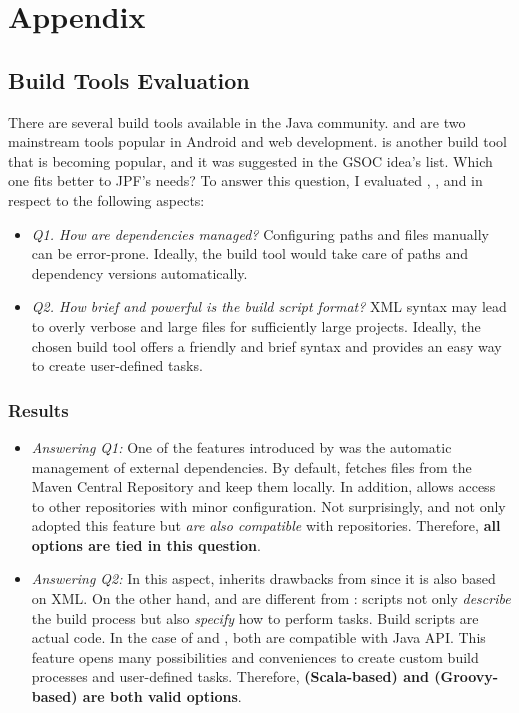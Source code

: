\documentclass{article}
\begin{document}
\section{Appendix}
\subsection{Build Tools Evaluation}
\label{sec:eval}

There are several build tools available in the Java community.
\maven{} and \gradle{} are two mainstream tools popular in Android and web
development.
\sbt{}\cite{page:sbt} is another build tool that is becoming popular, and it
was suggested in the GSOC idea's list\cite{page:jpf-gsoc18}.
Which one fits better to JPF's needs?
To answer this question, I evaluated \maven{}, \gradle{}, and \sbt{} in respect
to the following aspects:

\begin{itemize}
\item \emph{Q1. How are dependencies managed?} Configuring paths and \jar{}
files manually can be error-prone. Ideally, the build tool would take care of
paths and dependency versions automatically.
\item \emph{Q2. How brief and powerful is the build script format?} XML syntax
may lead to overly verbose and large files for sufficiently large projects.
Ideally, the chosen build tool offers a friendly and brief syntax and provides
an easy way to create user-defined tasks.

\end{itemize}

\subsubsection*{Results}
\label{sec:results}

\begin{itemize}
\item \emph{Answering Q1:}
One of the features introduced by \maven{} was the automatic management of
external dependencies.
By default, \maven{} fetches \jar{} files from the Maven Central
Repository\cite{page:mvncentral} and keep them locally.
In addition, \maven{} allows access to other repositories\cite{page:mvnrepo}
with minor configuration.
Not surprisingly, \gradle{} and \sbt{} not only adopted this feature but
\emph{are also compatible} with \maven{} repositories.
Therefore, \textbf{all options are tied in this question}.

\item \emph{Answering Q2:}
In this aspect, \maven{} inherits drawbacks from \ant{} since it is also based
on XML.
On the other hand, \gradle{} and \sbt{} are different from \maven{}: scripts
not only \emph{describe} the build process but also \emph{specify} how to
perform tasks.
Build scripts are actual code.
In the case of \sbt{} and \gradle{}, both are compatible with Java API.
This feature opens many possibilities and conveniences to create custom build
processes and user-defined tasks.
Therefore, \textbf{\sbt{} (Scala-based) and \gradle{} (Groovy-based) are both
valid options}.

\end{itemize}
\end{document}
